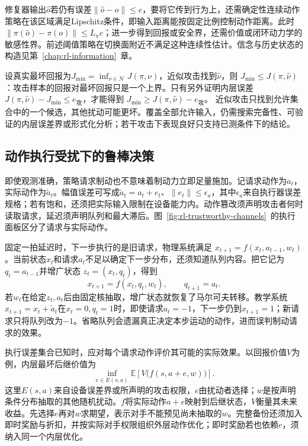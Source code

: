 修复器输出$\widehat o$若仍有误差$\|\widehat o-o\|\leq e$，要将它传到行为上，还需确定性连续动作策略在该区域满足Lipschitz条件，即输入距离能按固定比例控制动作距离。此时
$\|\pi(\widehat o)-\pi(o)\|\leq L_\pi e$；进一步得到回报或安全界，还需价值或闭环动力学的敏感性界。前述阈值策略在切换面附近不满足这种连续性估计。信念与历史状态的构造见第~\ref{chap:rl-information}~章。

设真实最坏回报为$J_{\min}=\inf_{\nu\in\mathcal N}J(\pi,\nu)$，近似攻击找到$\widehat\nu$，则
$J_{\min}\leq J(\pi,\widehat\nu)$：攻击样本的回报对最坏回报只是一个上界。只有另外证明内层误差
$J(\pi,\widehat\nu)-J_{\min}\leq e_{\text{攻}}$，才能得到
$J_{\min}\geq J(\pi,\widehat\nu)-e_{\text{攻}}$。
近似攻击只找到允许集合中的一个候选，其他扰动可能更坏。覆盖全部允许输入，仍需搜索完备性、可验证的内层误差界或形式化分析；若干攻击下表现良好只支持已测条件下的结论。

\subsection{动作执行受扰下的鲁棒决策}
\label{sec:rl-trustworthy-actuation}

即使观测准确，策略请求制动也不意味着制动力立即足量施加。记请求动作为$a_t$，实际动作为$\widetilde a_t$。幅值误差可写成$\widetilde a_t=a_t+e_t$、$\|e_t\|\leq\epsilon_a$，其中$\epsilon_a$来自执行器误差规格；若有饱和，还须把实际输入限制在设备能力内。动作篡改须声明攻击者何时读取请求，延迟须声明队列和最大滞后。图~\ref{fig:rl-trustworthy-channels}~的执行面板区分了请求与实际动作。

固定一拍延迟时，下一步执行的是旧请求，物理系统满足
$x_{t+1}=f(x_t,a_{t-1},w_t)$。当前状态$x_t$和请求$a_t$不足以确定下一步分布，还须知道队列内容。把它记为$q_t=a_{t-1}$并增广状态
$z_t=(x_t,q_t)$，得到
\begin{equation}
  x_{t+1}=f(x_t,q_t,w_t),\qquad q_{t+1}=a_t.
  \label{eq:rl-trustworthy-delay}
\end{equation}
若$w_t$在给定$z_t,a_t$后由固定核抽取，增广状态就恢复了马尔可夫转移。教学系统$x_{t+1}=x_t+\widetilde a_t$在$x_t=0,q_t=1$时，即使请求$a_t=-1$，下一步仍到$x_{t+1}=1$；新请求只将队列改为$-1$。省略队列会遗漏真正决定本步运动的动作，进而误判制动请求的效果。

执行误差集合已知时，应对每个请求动作评价其可能的实际效果。以回报价值$V$为例，内层最坏后继价值为
\begin{equation}
  \inf_{e\in E(s,a)}
       \mathbb E\!\left[V\bigl(f(s,a+e,w)\bigr)\right].
  \label{eq:rl-trustworthy-actuation-backup}
\end{equation}
这里$E(s,a)$来自设备误差界或所声明的攻击权限，$e$由扰动者选择；$w$是按声明条件分布抽取的其他随机扰动。$f$将实际动作$a+e$映射到后继状态，$V$衡量其未来收益。先选择$e$再对$w$求期望，表示对手不能预见尚未抽取的$w$。完整备份还须加入即时奖励与折扣，并按实际对手权限组织外层动作优化；即时奖励若也依赖$e$，须纳入同一个内层优化。

